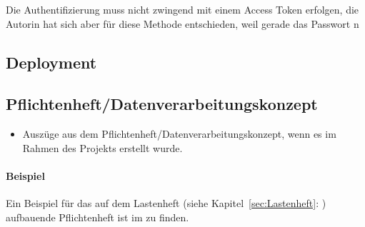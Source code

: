 Die Authentifizierung muss nicht zwingend mit einem Access Token erfolgen, die Autorin hat sich aber für diese Methode entschieden, weil gerade das Passwort n



\subsection{Deployment}
\label{sec:Deployment}

\subsection{Pflichtenheft/Datenverarbeitungskonzept}
\label{sec:Pflichtenheft}
\begin{itemize}
	\item Auszüge aus dem Pflichtenheft/Datenverarbeitungskonzept, wenn es im Rahmen des Projekts erstellt wurde.
\end{itemize}

\paragraph{Beispiel}
Ein Beispiel für das auf dem Lastenheft (siehe Kapitel~\ref{sec:Lastenheft}: ) aufbauende Pflichtenheft ist im  zu finden.


